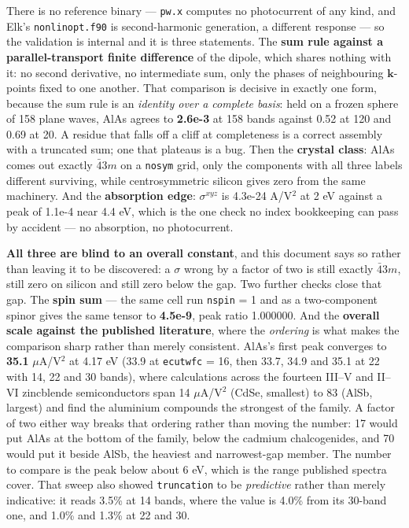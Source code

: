 \documentclass[11pt,a4paper]{article}
\newcommand{\code}[1]{\texttt{\small #1}}
\begin{document}
There is no reference binary --- \code{pw.x} computes no photocurrent of any
kind, and Elk's \code{nonlinopt.f90} is second-harmonic generation, a different
response --- so the validation is internal and it is three statements. The
\textbf{sum rule against a parallel-transport finite difference} of the dipole,
which shares nothing with it: no second derivative, no intermediate sum, only
the phases of neighbouring $\mathbf k$-points fixed to one another. That
comparison is decisive in exactly one form, because the sum rule is an
\emph{identity over a complete basis}: held on a frozen sphere of 158 plane
waves, AlAs agrees to \textbf{2.6e-3} at 158 bands against 0.52 at 120 and
0.69 at 20. A residue that falls off a cliff at completeness is a correct
assembly with a truncated sum; one that plateaus is a bug. Then the
\textbf{crystal class}: AlAs comes out exactly $\bar 43m$ on a \code{nosym}
grid, only the components with all three labels different surviving, while
centrosymmetric silicon gives zero from the same machinery. And the
\textbf{absorption edge}: $\sigma^{xyz}$ is 4.3e-24 A/V$^2$ at 2 eV against a
peak of 1.1e-4 near 4.4 eV, which is the one check no index bookkeeping can pass
by accident --- no absorption, no photocurrent.

\textbf{All three are blind to an overall constant}, and this document says so
rather than leaving it to be discovered: a $\sigma$ wrong by a factor of two is
still exactly $\bar 43m$, still zero on silicon and still zero below the gap.
Two further checks close that gap. The \textbf{spin sum} --- the same cell run
\code{nspin} = 1 and as a two-component spinor gives the same tensor to
\textbf{4.5e-9}, peak ratio 1.000000. And the \textbf{overall scale against the
published literature}, where the \emph{ordering} is what makes the comparison
sharp rather than merely consistent. AlAs's first peak converges to
\textbf{35.1} $\mu$A/V$^2$ at 4.17 eV (33.9 at \code{ecutwfc} = 16, then 33.7,
34.9 and 35.1 at 22 with 14, 22 and 30 bands), where calculations across the
fourteen III--V and II--VI zincblende semiconductors span 14 $\mu$A/V$^2$ (CdSe,
smallest) to 83 (AlSb, largest) and find the aluminium compounds the strongest of
the family. A factor of two either way breaks that ordering rather than moving
the number: 17 would put AlAs at the bottom of the family, below the cadmium
chalcogenides, and 70 would put it beside AlSb, the heaviest and narrowest-gap
member. The number to compare is the peak below about 6 eV, which is the range
published spectra cover. That sweep also showed \code{truncation} to be
\emph{predictive} rather than merely indicative: it reads 3.5\% at 14 bands, where
the value is 4.0\% from its 30-band one, and 1.0\% and 1.3\% at 22 and 30.
\end{document}
